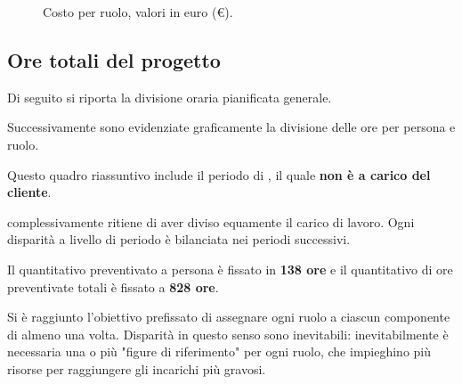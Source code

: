 \begin{figure}[H]
\label{tab:cvv}

  \caption{Costo {\VV} per ruolo, valori in euro (\euro).}
\end{figure}

\pagebreak[4]

\subsection{Ore totali del progetto}
Di seguito si riporta la divisione oraria pianificata generale.

Successivamente sono evidenziate graficamente la divisione delle ore per persona e ruolo.

Questo quadro riassuntivo include il periodo di {\AR}, il quale \textbf{non è a carico del cliente}.

{\hx} complessivamente ritiene di aver diviso equamente il carico di lavoro. Ogni disparità a livello di periodo è bilanciata nei periodi successivi. 

Il quantitativo preventivato a persona è fissato in \textbf{138 ore} e il quantitativo di ore preventivate totali è fissato a \textbf{828 ore}.

Si è raggiunto l'obiettivo prefissato di assegnare ogni ruolo a ciascun componente di {\hx} almeno una volta. Disparità in questo senso sono inevitabili: inevitabilmente è necessaria una o più "figure di riferimento" per ogni ruolo, che impieghino più risorse per raggiungere gli incarichi più gravosi.


